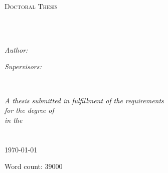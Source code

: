 \documentclass[
11pt, %
english, %
onehalfspacing, %
headsepline, %
]{MastersDoctoralThesis} %
\author{Thomas J. \textsc{Delaney}} %
\begin{document}
\frontmatter %

\pagestyle{plain} %


\begin{titlepage}
\begin{center}

\vspace*{.06\textheight}
{\scshape\LARGE \univname\par}\vspace{1.5cm} %
\textsc{\Large Doctoral Thesis}\\[0.5cm] %

\HRule \\[0.4cm] %
{\huge \bfseries \ttitle\par}\vspace{0.4cm} %
\HRule \\[1.5cm] %

\begin{minipage}[t]{0.4\textwidth}
\begin{flushleft} \large
\emph{Author:}\\
\authorname %
\end{flushleft}
\end{minipage}
\begin{minipage}[t]{0.4\textwidth}
\begin{flushright} \large
\emph{Supervisors:} \\
\supname %
\end{flushright}
\end{minipage}\\[2cm]

\vfill

\large \textit{A thesis submitted in fulfillment of the requirements\\ for the degree of \degreename}\\[0.3cm] %
\textit{in the}\\[0.4cm]
\groupname\\\deptname\\[1cm] %


{\large \today} %
\begin{flushright}
Word count: $39000$ \\[4cm]
\end{flushright}
\vfill
\end{center}
\end{titlepage}
\end{document}
